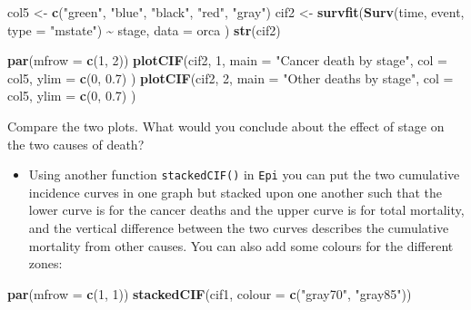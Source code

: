 \documentclass[
]{book}
\newenvironment{Shaded}{\begin{snugshade}}{\end{snugshade}}
\newcommand{\AttributeTok}[1]{\textcolor[rgb]{0.13,0.29,0.53}{#1}}
\newcommand{\DecValTok}[1]{\textcolor[rgb]{0.00,0.00,0.81}{#1}}
\newcommand{\FloatTok}[1]{\textcolor[rgb]{0.00,0.00,0.81}{#1}}
\newcommand{\FunctionTok}[1]{\textcolor[rgb]{0.13,0.29,0.53}{\textbf{#1}}}
\newcommand{\NormalTok}[1]{#1}
\newcommand{\OtherTok}[1]{\textcolor[rgb]{0.56,0.35,0.01}{#1}}
\newcommand{\SpecialCharTok}[1]{\textcolor[rgb]{0.81,0.36,0.00}{\textbf{#1}}}
\newcommand{\StringTok}[1]{\textcolor[rgb]{0.31,0.60,0.02}{#1}}
\providecommand{\tightlist}{%
  \setlength{\itemsep}{0pt}\setlength{\parskip}{0pt}}
\begin{document}
\begin{Shaded}
\begin{Highlighting}[]
\NormalTok{col5 }\OtherTok{\textless{}{-}} \FunctionTok{c}\NormalTok{(}\StringTok{"green"}\NormalTok{, }\StringTok{"blue"}\NormalTok{, }\StringTok{"black"}\NormalTok{, }\StringTok{"red"}\NormalTok{, }\StringTok{"gray"}\NormalTok{)}
\NormalTok{cif2 }\OtherTok{\textless{}{-}} \FunctionTok{survfit}\NormalTok{(}\FunctionTok{Surv}\NormalTok{(time, event, }\AttributeTok{type =} \StringTok{"mstate"}\NormalTok{) }\SpecialCharTok{\textasciitilde{}}\NormalTok{ stage,}
  \AttributeTok{data =}\NormalTok{ orca}
\NormalTok{)}
\FunctionTok{str}\NormalTok{(cif2)}

\FunctionTok{par}\NormalTok{(}\AttributeTok{mfrow =} \FunctionTok{c}\NormalTok{(}\DecValTok{1}\NormalTok{, }\DecValTok{2}\NormalTok{))}
\FunctionTok{plotCIF}\NormalTok{(cif2, }\DecValTok{1}\NormalTok{,}
  \AttributeTok{main =} \StringTok{"Cancer death by stage"}\NormalTok{,}
  \AttributeTok{col =}\NormalTok{ col5, }\AttributeTok{ylim =} \FunctionTok{c}\NormalTok{(}\DecValTok{0}\NormalTok{, }\FloatTok{0.7}\NormalTok{)}
\NormalTok{)}
\FunctionTok{plotCIF}\NormalTok{(cif2, }\DecValTok{2}\NormalTok{,}
  \AttributeTok{main =} \StringTok{"Other deaths by stage"}\NormalTok{,}
  \AttributeTok{col =}\NormalTok{ col5, }\AttributeTok{ylim =} \FunctionTok{c}\NormalTok{(}\DecValTok{0}\NormalTok{, }\FloatTok{0.7}\NormalTok{)}
\NormalTok{)}
\end{Highlighting}
\end{Shaded}

Compare the two plots. What would you conclude about the
effect of stage on the two causes of death?

\begin{itemize}
\tightlist
\item
  Using another function \texttt{stackedCIF()} in \texttt{Epi} you can
  put the two cumulative incidence curves in one graph but stacked upon one another such that
  the lower curve is for the cancer deaths and the upper curve is for total mortality,
  and the vertical difference between the two curves describes the
  cumulative mortality from other causes. You can also add some colours for the different zones:
\end{itemize}

\begin{Shaded}
\begin{Highlighting}[]
\FunctionTok{par}\NormalTok{(}\AttributeTok{mfrow =} \FunctionTok{c}\NormalTok{(}\DecValTok{1}\NormalTok{, }\DecValTok{1}\NormalTok{))}
\FunctionTok{stackedCIF}\NormalTok{(cif1, }\AttributeTok{colour =} \FunctionTok{c}\NormalTok{(}\StringTok{"gray70"}\NormalTok{, }\StringTok{"gray85"}\NormalTok{))}
\end{Highlighting}
\end{Shaded}
\end{document}
